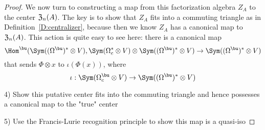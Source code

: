 \begin{proof}
We now turn to constructing a map from this factorization algebra $Z_A$ to the center ${\frak Z}_n(A)$.
The key is to show that $Z_A$ fits into a commuting triangle as in Definition~\ref{D:centralizer},
because then we know $Z_A$ has a canonical map to~${\frak Z}_n(A)$.
This action is quite easy to see here: there is a canonical map
\[
\Hom^\bu(\Sym((\Omega^\bu)^* \otimes V), \Sym(\Omega_c^* \otimes V) \otimes \Sym((\Omega^\bu)^* \otimes V) \to \Sym((\Omega^\bu)^* \otimes V)
\]
that sends $\Phi \otimes x$ to $\iota(\Phi(x))$,
where 
\[
\iota: \Sym(\Omega_c^\bu \otimes V) \to \Sym((\Omega^\bu)^* \otimes V)
\]

4) Show this putative center fits into the commuting triangle and hence possesses a canonical map to the "true" center

5) Use the Francis-Lurie recognition principle to show this map is a quasi-iso
\end{proof}
